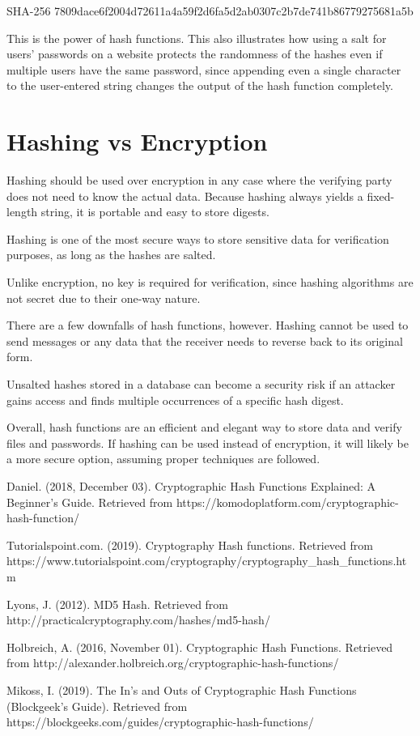 \documentclass{article}
\begin{document}
SHA-256 7809dace6f2004d72611a4a59f2d6fa5d2ab0307c2b7de741b86779275681a5b

This is the power of hash functions. This also illustrates how using a salt for users' passwords on a website protects the randomness of the hashes even if multiple users have the same password, since appending even a single character to the user-entered string changes the output of the hash function completely.

\section{Hashing vs Encryption}

Hashing should be used over encryption in any case where the verifying party does not need to know the actual data. Because hashing always yields a fixed-length string, it is portable and easy to store digests.

Hashing is one of the most secure ways to store sensitive data for verification purposes, as long as the hashes are salted. 

Unlike encryption, no key is required for verification, since hashing algorithms are not secret due to their one-way nature.

There are a few downfalls of hash functions, however. Hashing cannot be used to send messages or any data that the receiver needs to reverse back to its original form. 

Unsalted hashes stored in a database can become a security risk if an attacker gains access and finds multiple occurrences of a specific hash digest.

Overall, hash functions are an efficient and elegant way to store data and verify files and passwords. If hashing can be used instead of encryption, it will likely be a more secure option, assuming proper techniques are followed.

\newpage
\begin{thebibliography}{}
	Daniel. (2018, December 03). Cryptographic Hash Functions Explained: A Beginner's Guide. Retrieved from {https://komodoplatform.com/cryptographic-hash-function/}
	
	Tutorialspoint.com. (2019). Cryptography Hash functions. Retrieved from https://www.tutorialspoint.com/cryptography/cryptography\_hash\_functions.htm
	
	Lyons, J. (2012). MD5 Hash. Retrieved from {http://practicalcryptography.com/hashes/md5-hash/}
	
	Holbreich, A. (2016, November 01). Cryptographic Hash Functions. Retrieved from {http://alexander.holbreich.org/cryptographic-hash-functions/}	
	
	Mikoss, I. (2019). The In's and Outs of Cryptographic Hash Functions (Blockgeek's Guide).
	Retrieved from {https://blockgeeks.com/guides/cryptographic-hash-functions/}
\end{thebibliography}
\end{document}
